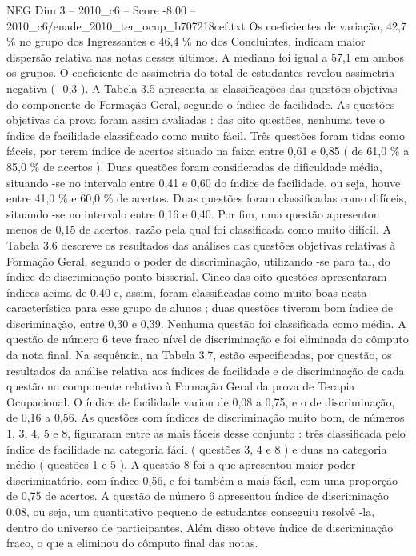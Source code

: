 \begin{textsample}{NEG Dim 3 – 2010\_c6 – Score -8.00 – 2010\_c6/enade\_2010\_ter\_ocup\_b707218cef.txt}
Os coeficientes de variação, 42,7 \% no grupo dos Ingressantes e 46,4 \% no dos Concluintes, indicam maior dispersão relativa nas notas desses últimos.
A mediana foi igual a 57,1 em ambos os grupos.
O coeficiente de assimetria do total de estudantes revelou assimetria negativa ( -0,3 ).
A Tabela 3.5 apresenta as classificações das questões objetivas do componente de Formação Geral, segundo o índice de facilidade.
As questões objetivas da prova foram assim avaliadas : das oito questões, nenhuma teve o índice de facilidade classificado como muito fácil.
Três questões foram tidas como fáceis, por terem índice de acertos situado na faixa entre 0,61 e 0,85 ( de 61,0 \% a 85,0 \% de acertos ).
Duas questões foram consideradas de dificuldade média, situando -se no intervalo entre 0,41 e 0,60 do índice de facilidade, ou seja, houve entre 41,0 \% e 60,0 \% de acertos.
Duas questões foram classificadas como difíceis, situando -se no intervalo entre 0,16 e 0,40.
Por fim, uma questão apresentou menos de 0,15 de acertos, razão pela qual foi classificada como muito difícil.
A Tabela 3.6 descreve os resultados das análises das questões objetivas relativas à Formação Geral, segundo o poder de discriminação, utilizando -se para tal, do índice de discriminação ponto bisserial.
Cinco das oito questões apresentaram índices acima de 0,40 e, assim, foram classificadas como muito boas nesta característica para esse grupo de alunos ; duas questões tiveram bom índice de discriminação, entre 0,30 e 0,39.
Nenhuma questão foi classificada como média.
A questão de número 6 teve fraco nível de discriminação e foi eliminada do cômputo da nota final.
Na sequência, na Tabela 3.7, estão especificadas, por questão, os resultados da análise relativa aos índices de facilidade e de discriminação de cada questão no componente relativo à Formação Geral da prova de Terapia Ocupacional.
O índice de facilidade variou de 0,08 a 0,75, e o de discriminação, de 0,16 a 0,56.
As questões com índices de discriminação muito bom, de números 1, 3, 4, 5 e 8, figuraram entre as mais fáceis desse conjunto : três classificada pelo índice de facilidade na categoria fácil ( questões 3, 4 e 8 ) e duas na categoria médio ( questões 1 e 5 ).
A questão 8 foi a que apresentou maior poder discriminatório, com índice 0,56, e foi também a mais fácil, com uma proporção de 0,75 de acertos.
A questão de número 6 apresentou índice de discriminação 0,08, ou seja, um quantitativo pequeno de estudantes conseguiu resolvê -la, dentro do universo de participantes.
Além disso obteve índice de discriminação fraco, o que a eliminou do cômputo final das notas.

\end{textsample}
